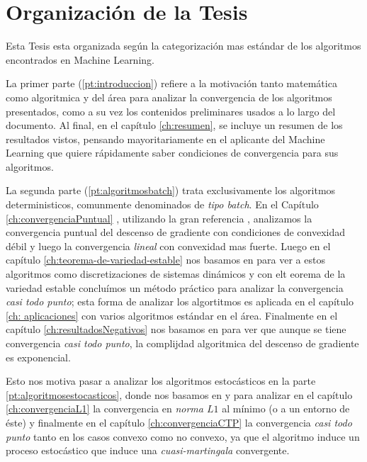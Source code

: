 \section{Organizaci\'on de la Tesis}

Esta Tesis esta organizada seg\'un la categorizaci\'on mas est\'andar de los algoritmos encontrados en Machine Learning.

La primer parte (\ref{pt:introduccion}) refiere a la motivaci\'on tanto matem\'atica como algoritmica y del \'area para analizar la convergencia de los algoritmos presentados, como a su vez los contenidos preliminares usados a lo largo del documento. Al final, en el cap\'itulo \ref{ch:resumen}, se incluye un resumen de los resultados vistos, pensando mayoritariamente  en el aplicante del Machine Learning que quiere r\'apidamente saber condiciones de convergencia para sus algoritmos.

La segunda parte (\ref{pt:algoritmosbatch}) trata exclusivamente los algoritmos deterministicos, comunmente denominados de \textit{tipo batch}. En el Cap\'itulo \ref{ch:convergenciaPuntual} , utilizando la gran referencia \cite{nesterov:2004}, analizamos la convergencia puntual del descenso de gradiente con condiciones de convexidad d\'ebil y luego la convergencia \textit{lineal} con convexidad mas fuerte. Luego en el cap\'itulo \ref{ch:teorema-de-variedad-estable} nos basamos en \cite{lee:2017} para ver a estos algoritmos como discretizaciones de sistemas din\'amicos y con elt eorema de la variedad estable conclu\'imos un m\'etodo pr\'actico para analizar la convergencia \textit{casi todo punto}; esta forma de analizar los algortitmos es aplicada en el cap\'itulo \ref{ch: aplicaciones} con varios algoritmos est\'andar en el \'area. Finalmente en el cap\'itulo \ref{ch:resultadosNegativos} nos basamos en \cite{du:2017} para ver que aunque se tiene convergencia \textit{casi todo punto}, la complijdad algoritmica del descenso de gradiente es exponencial.

Esto nos motiva pasar a analizar los algoritmos estoc\'asticos en la parte \ref{pt:algoritmosestocasticos}, donde nos basamos en \cite{bottou:1999} y \cite{bottou:2016} para analizar en el cap\'itulo \ref{ch:convergenciaL1} la convergencia en \textit{norma $L1$} al m\'inimo (o a un entorno de \'este) y finalmente en el cap\'itulo \ref{ch:convergenciaCTP} la convergencia \textit{casi todo punto} tanto en los casos convexo como no convexo, ya que el algoritmo induce un proceso estoc\'astico que induce una \textit{cuasi-martingala} convergente.

\smallskip
